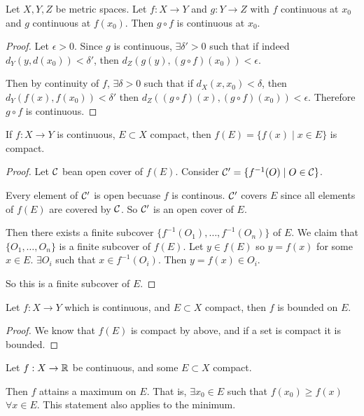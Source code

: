 \begin{theorem}
    Let $X, Y, Z$ be metric spaces. Let $f : X\to Y$ and $g : Y\to Z$ with $f$ continuous at $x_0$ and $g$ continuous at $f(x_0)$. Then $g\circ f$ is continuous at $x_0$.
\end{theorem}
\begin{proof}
    Let $\epsilon > 0$. Since $g$ is continuous, $\exists \delta' > 0$ such that if indeed $d_Y(y, d(x_0)) < \delta'$, then $d_Z(g(y), (g\circ f)(x_0)) < \epsilon$.

    Then by continuity of $f$, $\exists \delta > 0$ such that if $d_X(x, x_0) < \delta$, then $d_Y(f(x), f(x_0)) < \delta'$ then $d_Z((g\circ f)(x), (g\circ f)(x_0)) < \epsilon$. Therefore $g\circ f$ is continuous.
\end{proof}

\begin{theorem}
    If $f: X\to Y$ is continuous, $E\subset X$ compact, then $f(E) = \{f(x)\mid x\in E\}$ is compact.
\end{theorem}
\begin{proof}
    Let $\mathcal C$ bean open cover of $f(E)$. Consider $\mathcal C' = \{f^{-1}(O)\mid O\in \mathcal C\}$.

    Every element of $\mathcal C'$ is open becuase $f$ is continous. $\mathcal C'$ covers $E$ since all elements of $f(E)$ are covered by $\mathcal C$. So $\mathcal C'$ is an open cover of $E$.

    Then there exists a finite subcover $\{f^{-1}(O_1), \dots, f^{-1}(O_n)\}$ of $E$. We claim that $\{O_1, \dots, O_n\}$ is a finite subcover of $f(E)$. Let $y\in f(E)$ so $y = f(x)$ for some $x\in E$. $\exists O_i$ such that $x\in f^{-1}(O_i)$. Then $y = f(x) \in O_i$.

    So this is a finite subcover of $E$.
\end{proof}

\begin{corollary}
    Let $f : X\to Y$ which is continuous, and $E\subset X$ compact, then $f$ is bounded on $E$.
\end{corollary}
\begin{proof}
    We know that $f(E)$ is compact by above, and if a set is compact it is bounded.
\end{proof}

\begin{corollary}
    Let $f : X\to \mathbb R$ be continuous, and some $E\subset X$ compact.

    Then $f$ attains a maximum on $E$. That is, $\exists x_0\in E$ such that $f(x_0)\geq f(x)$ $\forall x\in E$. This statement also applies to the minimum.
\end{corollary}

